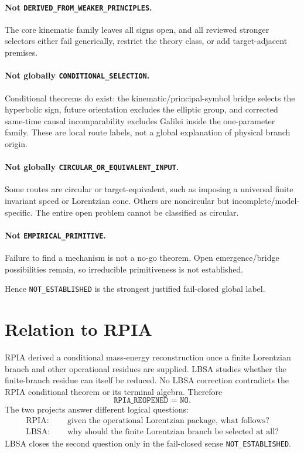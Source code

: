 \documentclass[11pt,a4paper]{article}
\newcommand{\status}[1]{\texttt{#1}}
\begin{document}
\paragraph{Not \status{DERIVED\_FROM\_WEAKER\_PRINCIPLES}.}
The core kinematic family leaves all signs open, and all reviewed stronger selectors either fail generically, restrict the theory class, or add target-adjacent premises.

\paragraph{Not globally \status{CONDITIONAL\_SELECTION}.}
Conditional theorems do exist: the kinematic/principal-symbol bridge selects the hyperbolic sign, future orientation excludes the elliptic group, and corrected same-time causal incomparability excludes Galilei inside the one-parameter family.  These are local route labels, not a global explanation of physical branch origin.

\paragraph{Not globally \status{CIRCULAR\_OR\_EQUIVALENT\_INPUT}.}
Some routes are circular or target-equivalent, such as imposing a universal finite invariant speed or Lorentzian cone.  Others are noncircular but incomplete/model-specific.  The entire open problem cannot be classified as circular.

\paragraph{Not \status{EMPIRICAL\_PRIMITIVE}.}
Failure to find a mechanism is not a no-go theorem.  Open emergence/bridge possibilities remain, so irreducible primitiveness is not established.

Hence \status{NOT\_ESTABLISHED} is the strongest justified fail-closed global label.

\section{Relation to RPIA}
RPIA derived a conditional mass-energy reconstruction once a finite Lorentzian branch and other operational residues are supplied.  LBSA studies whether the finite-branch residue can itself be reduced.  No LBSA correction contradicts the RPIA conditional theorem or its terminal algebra.  Therefore
\[
\status{RPIA\_REOPENED = NO}.
\]
The two projects answer different logical questions:
\begin{align*}
\text{RPIA: }&\quad \text{given the operational Lorentzian package, what follows?}\\
\text{LBSA: }&\quad \text{why should the finite Lorentzian branch be selected at all?}
\end{align*}
LBSA closes the second question only in the fail-closed sense \status{NOT\_ESTABLISHED}.
\end{document}
